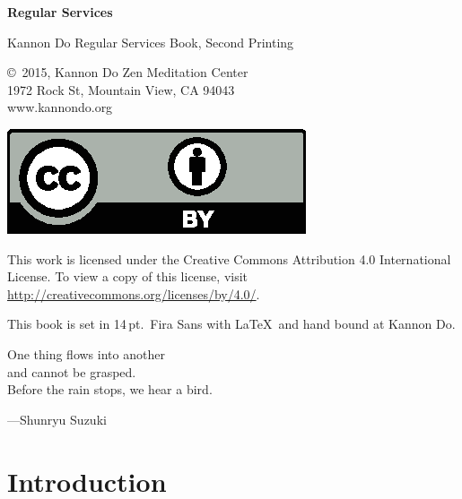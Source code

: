 \documentclass{chantbook}
\begin{document}

\frontmatter
\begin{titlepage}
{\Huge\bf Regular Services}
\end{titlepage}

\begin{colophon}
Kannon Do Regular Services Book, Second Printing

\bigskip

\copyright\ 2015, Kannon Do Zen Meditation Center\\
1972 Rock St, Mountain View, CA 94043\\
www.kannondo.org

\includegraphics{by}

This work is licensed under the Creative Commons Attribution 4.0 International
License. To view a copy of this license, visit
\url{http://creativecommons.org/licenses/by/4.0/}.

\bigskip

This book is set in 14\,pt.\ Fira Sans with \LaTeX\ and hand bound at Kannon Do.
\end{colophon}

\begin{dedication}
One thing flows into another\\
and cannot be grasped.\\
Before the rain stops, we hear a bird.

---Shunryu Suzuki
\end{dedication}

\cleardoublepage

\tableofcontents

\mainmatter

\chapter{Introduction}
\end{document}
